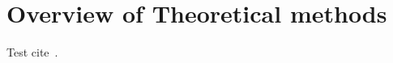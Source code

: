 
\section{Overview of Theoretical methods}
\label{sec:theoryoverview}

Test cite~\cite{Corbett:2014ora}.

